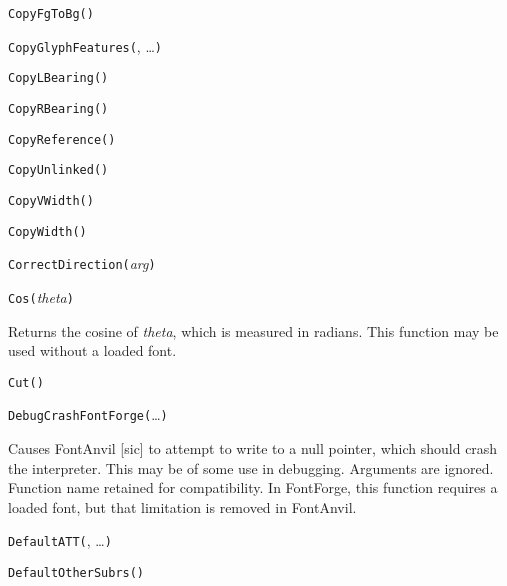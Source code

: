 
\noindent\texttt{CopyFgToBg(}\texttt{)}


\noindent\texttt{CopyGlyphFeatures(}, \ldots\texttt{)}


\noindent\texttt{CopyLBearing(}\texttt{)}


\noindent\texttt{CopyRBearing(}\texttt{)}


\noindent\texttt{CopyReference(}\texttt{)}


\noindent\texttt{CopyUnlinked(}\texttt{)}


\noindent\texttt{CopyVWidth(}\texttt{)}


\noindent\texttt{CopyWidth(}\texttt{)}


\noindent\texttt{CorrectDirection(}\textit{arg}\texttt{)}


\noindent\texttt{Cos(}\textit{theta}\texttt{)}

Returns the cosine of \textit{theta}, which is measured in radians.
This function may be used without a loaded font.


\noindent\texttt{Cut(}\texttt{)}


\noindent\texttt{DebugCrashFontForge(}\ldots\texttt{)}

Causes FontAnvil [sic] to attempt to write to a null pointer, which should
crash the interpreter.  This may be of some use in debugging.  Arguments are
ignored.  Function name retained for compatibility.  In FontForge, this
function requires a loaded font, but that limitation is removed in FontAnvil.


\noindent\texttt{DefaultATT(}, \ldots\texttt{)}


\noindent\texttt{DefaultOtherSubrs(}\texttt{)}

